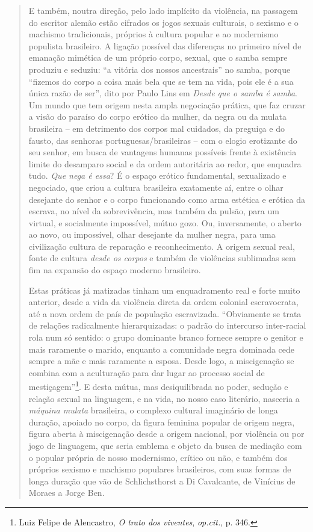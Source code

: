 \begin{quote}
E também, noutra direção, pelo lado implícito da violência, na passagem
do escritor alemão estão cifrados os jogos sexuais culturais, o sexismo
e o machismo tradicionais, próprios à cultura popular e ao modernismo
populista brasileiro. A ligação possível das diferenças no primeiro
nível de emanação mimética de um próprio corpo, sexual, que o samba
sempre produziu e seduziu: ``a vitória dos nossos ancestrais'' no samba,
porque ``fizemos do corpo a coisa mais bela que se tem na vida, pois ele
é a sua única razão de ser'', dito por Paulo Lins em \emph{Desde que o
samba é samba}. Um mundo que tem origem nesta ampla negociação prática,
que faz cruzar a visão do paraíso do corpo erótico da mulher, da negra
ou da mulata brasileira -- em detrimento dos corpos mal cuidados, da
preguiça e do fausto, das senhoras portuguesas/brasileiras -- com o
elogio erotizante do seu senhor, em busca de vantagens humanas possíveis
frente à existência limite do desamparo social e da ordem autoritária ao
redor, que enquadra tudo. \emph{Que nega é essa}? É o espaço erótico
fundamental, sexualizado e negociado, que criou a cultura brasileira
exatamente aí, entre o olhar desejante do senhor e o corpo funcionando
como arma estética e erótica da escrava, no nível da sobrevivência, mas
também da pulsão, para um virtual, e socialmente impossível, mútuo gozo.
Ou, inversamente, o aberto ao novo, ou impossível, olhar desejante da
mulher negra, para uma civilização cultura de reparação e
reconhecimento. A origem sexual real, fonte de cultura \emph{desde os
corpos} e também de violências sublimadas sem fim na expansão do espaço
moderno brasileiro.

Estas práticas já matizadas tinham um enquadramento real e forte muito
anterior, desde a vida da violência direta da ordem colonial
escravocrata, até a nova ordem de país de população escravizada.
``Obviamente se trata de relações radicalmente hierarquizadas: o padrão
do intercurso inter-racial rola num só sentido: o grupo dominante branco
fornece sempre o genitor e mais raramente o marido, enquanto a
comunidade negra dominada cede sempre a mãe e mais raramente a esposa.
Desde logo, a miscigenação se combina com a aculturação para dar lugar
ao processo social de mestiçagem''\footnote{Luiz Felipe de Alencastro,
  \emph{O trato dos viventes}, \emph{op.cit.}, p. 346.}. E desta mútua,
mas desiquilibrada no poder, sedução e relação sexual na linguagem, e na
vida, no nosso caso literário, nasceria a \emph{máquina mulata}
brasileira, o complexo cultural imaginário de longa duração, apoiado no
corpo, da figura feminina popular de origem negra, figura aberta à
miscigenação desde a origem nacional, por violência ou por jogo de
linguagem, que seria emblema e objeto da busca de mediação com o popular
própria de nosso modernismo, crítico ou não, e também dos próprios
sexismo e machismo populares brasileiros, com suas formas de longa
duração que vão de Schlichsthorst a Di Cavalcante, de Vinícius de Moraes
a Jorge Ben.


\end{quote}
